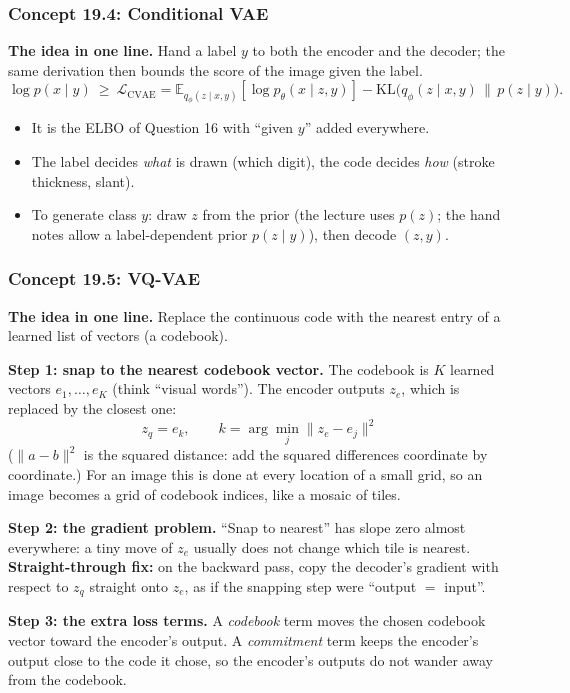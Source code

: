\documentclass[12pt,a4paper]{article}
\begin{document}
\subsubsection{Concept 19.4: Conditional VAE}\label{c19-4}

\textbf{The idea in one line.} Hand a label $y$ to both the encoder and the decoder; the same derivation then bounds the score of the image given the label.
\[
\log p(x\mid y)\ \ge\ \mathcal{L}_{\text{CVAE}}=\mathbb{E}_{q_\phi(z\mid x,y)}[\log p_\theta(x\mid z,y)]-\mathrm{KL}\big(q_\phi(z\mid x,y)\,\|\,p(z\mid y)\big).
\]
\begin{itemize}[nosep]
  \item It is the ELBO of Question 16 with ``given $y$'' added everywhere.
  \item The label decides \emph{what} is drawn (which digit), the code decides \emph{how} (stroke thickness, slant).
  \item To generate class $y$: draw $z$ from the prior (the lecture uses $p(z)$; the hand notes allow a label-dependent prior $p(z\mid y)$), then decode $(z,y)$.
\end{itemize}

\subsubsection{Concept 19.5: VQ-VAE}\label{c19-5}

\textbf{The idea in one line.} Replace the continuous code with the nearest entry of a learned list of vectors (a codebook).

\textbf{Step 1: snap to the nearest codebook vector.} The codebook is $K$ learned vectors $e_1,\dots,e_K$ (think ``visual words''). The encoder outputs $z_e$, which is replaced by the closest one:
\[
z_q=e_k,\qquad k=\arg\min_j\|z_e-e_j\|^2
\]
($\|a-b\|^2$ is the squared distance: add the squared differences coordinate by coordinate.) For an image this is done at every location of a small grid, so an image becomes a grid of codebook indices, like a mosaic of tiles.

\textbf{Step 2: the gradient problem.} ``Snap to nearest'' has slope zero almost everywhere: a tiny move of $z_e$ usually does not change which tile is nearest. \textbf{Straight-through fix:} on the backward pass, copy the decoder's gradient with respect to $z_q$ straight onto $z_e$, as if the snapping step were ``output $=$ input''.

\textbf{Step 3: the extra loss terms.} A \emph{codebook} term moves the chosen codebook vector toward the encoder's output. A \emph{commitment} term keeps the encoder's output close to the code it chose, so the encoder's outputs do not wander away from the codebook.
\end{document}
